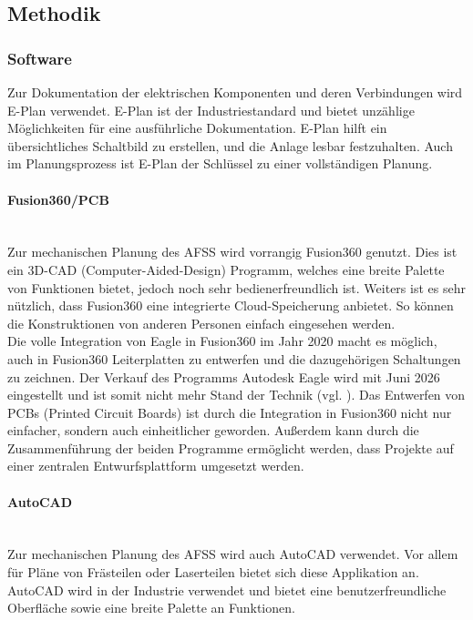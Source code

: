\subsection{Methodik}

\subsubsection{Software}

Zur Dokumentation der elektrischen Komponenten und deren Verbindungen wird E-Plan verwendet. E-Plan ist der Industriestandard und bietet unzählige Möglichkeiten für eine ausführliche Dokumentation. E-Plan hilft ein übersichtliches Schaltbild zu erstellen, und die Anlage lesbar festzuhalten. Auch im Planungsprozess ist E-Plan der Schlüssel zu einer vollständigen Planung.

\paragraph{Fusion360/PCB}\mbox{}\\
Zur mechanischen Planung des AFSS wird vorrangig Fusion360 genutzt. Dies ist ein 3D-CAD (Computer-Aided-Design) Programm, welches eine breite Palette von Funktionen bietet, jedoch noch sehr bedienerfreundlich ist. Weiters ist es sehr nützlich, dass Fusion360 eine integrierte Cloud-Speicherung anbietet. So können die Konstruktionen von anderen Personen einfach eingesehen werden.\\

Die volle Integration von Eagle in Fusion360 im Jahr 2020 macht es möglich, auch in Fusion360 Leiterplatten zu entwerfen und die dazugehörigen Schaltungen zu zeichnen. Der Verkauf des Programms Autodesk Eagle wird mit Juni 2026 eingestellt und ist somit nicht mehr Stand der Technik (vgl. \cite{Eagle_in_Fusion}). Das Entwerfen von PCBs (Printed Circuit Boards) ist durch die Integration in Fusion360 nicht nur einfacher, sondern auch einheitlicher geworden. Außerdem kann durch die Zusammenführung der beiden Programme ermöglicht werden, dass Projekte auf einer zentralen Entwurfsplattform umgesetzt werden.

\paragraph{AutoCAD}\mbox{}\\
Zur mechanischen Planung des AFSS wird auch AutoCAD verwendet. Vor allem für Pläne von Frästeilen oder Laserteilen bietet sich diese Applikation an. AutoCAD wird in der Industrie verwendet und bietet eine benutzerfreundliche Oberfläche sowie eine breite Palette an Funktionen.


